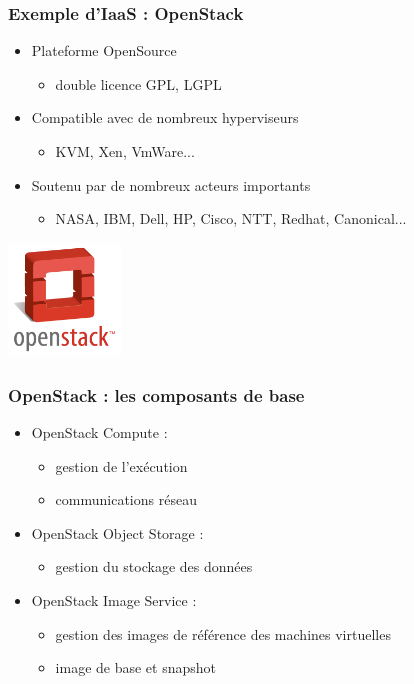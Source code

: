 \begin{frame}
  \frametitle{Exemple d'IaaS : OpenStack}
  \begin{itemize}
  \item Plateforme OpenSource
  \begin{itemize}
    \item double licence GPL, LGPL
  \end{itemize}

  \item Compatible avec de nombreux hyperviseurs
  \begin{itemize}
    \item KVM, Xen, VmWare...
  \end{itemize}

  \item Soutenu par de nombreux acteurs importants
  \begin{itemize}
  \item NASA, IBM, Dell, HP, Cisco, NTT, Redhat, Canonical...
  \end{itemize}
  \end{itemize}
  \includegraphics[height=3cm]{../illustration/logo-openstack.png}
\end{frame}

\begin{frame}
  \frametitle{OpenStack : les composants de base}
  \begin{itemize}
  \item OpenStack Compute :
\begin{itemize}
\item gestion de l'exécution
\item communications réseau
\end{itemize}

  \item OpenStack Object Storage : \begin{itemize}
\item gestion du stockage des données
\end{itemize}

  \item OpenStack Image Service : \begin{itemize}
\item gestion des images de référence des machines virtuelles
\item image de base et snapshot
\end{itemize}

  \end{itemize}
\end{frame}

